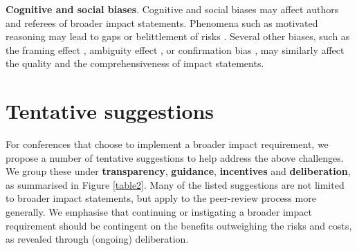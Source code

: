 \documentclass[11pt,english]{article}
\begin{document}
	\textbf{Cognitive and social biases}. Cognitive and social biases may affect authors and referees of broader impact statements. Phenomena such as motivated reasoning may lead to gaps or belittlement of risks \citep{stanovich_myside_2013}. Several other biases, such as the framing effect \citep{plous_psychology_1993}, ambiguity effect \citep{curley_psychological_1986}, or confirmation bias \citep{nickerson_confirmation_1998}, may similarly affect the quality and the comprehensiveness of impact statements.
	
	
	
	\section*{Tentative suggestions}
	
	For conferences that choose to implement a broader impact requirement, we propose a number of tentative suggestions to help address the above challenges. We group these under \textbf{transparency}, \textbf{guidance}, \textbf{incentives} and \textbf{deliberation}, as summarised in Figure \ref{table2}. Many of the listed suggestions are not limited to broader impact statements, but apply to the peer-review process more generally. We emphasise that continuing or instigating a broader impact requirement should be contingent on the benefits outweighing the risks and costs, as revealed through (ongoing) deliberation.
	
	
	
\end{document}
